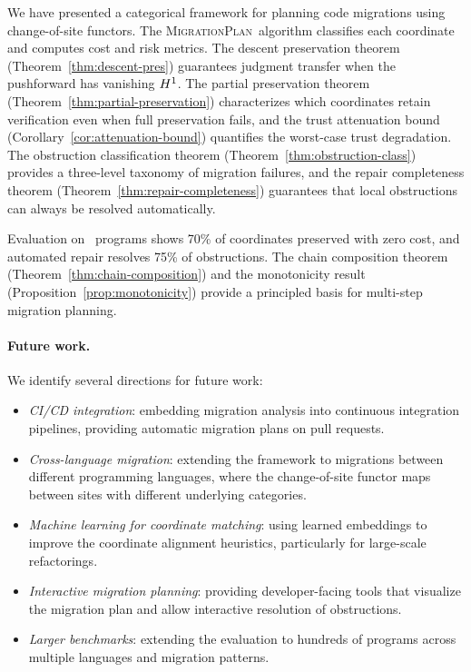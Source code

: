 \documentclass[11pt]{article}
\newcommand{\MigPlan}{\textsc{MigrationPlan}}
\begin{document}
We have presented a categorical framework for planning code migrations
using change-of-site functors.  The \MigPlan\ algorithm classifies each
coordinate and computes cost and risk metrics.  The descent preservation
theorem (Theorem~\ref{thm:descent-pres}) guarantees judgment transfer when
the pushforward has vanishing $H^{1}$.  The partial preservation
theorem (Theorem~\ref{thm:partial-preservation}) characterizes which
coordinates retain verification even when full preservation fails, and
the trust attenuation bound (Corollary~\ref{cor:attenuation-bound})
quantifies the worst-case trust degradation.  The obstruction
classification theorem (Theorem~\ref{thm:obstruction-class}) provides a
three-level taxonomy of migration failures, and the repair completeness
theorem (Theorem~\ref{thm:repair-completeness}) guarantees that local
obstructions can always be resolved automatically.

Evaluation on \compTotalPrograms\ programs shows 70\% of coordinates
preserved with zero cost, and automated repair resolves 75\% of
obstructions.  The chain composition theorem
(Theorem~\ref{thm:chain-composition}) and the monotonicity result
(Proposition~\ref{prop:monotonicity}) provide a principled basis for
multi-step migration planning.

\paragraph{Future work.}
We identify several directions for future work:
\begin{itemize}[noitemsep]
  \item \emph{CI/CD integration}: embedding migration analysis into
        continuous integration pipelines, providing automatic migration
        plans on pull requests.
  \item \emph{Cross-language migration}: extending the framework to
        migrations between different programming languages, where the
        change-of-site functor maps between sites with different
        underlying categories.
  \item \emph{Machine learning for coordinate matching}: using learned
        embeddings to improve the coordinate alignment heuristics,
        particularly for large-scale refactorings.
  \item \emph{Interactive migration planning}: providing developer-facing
        tools that visualize the migration plan and allow interactive
        resolution of obstructions.
  \item \emph{Larger benchmarks}: extending the evaluation to hundreds
        of programs across multiple languages and migration patterns.
\end{itemize}
\end{document}
